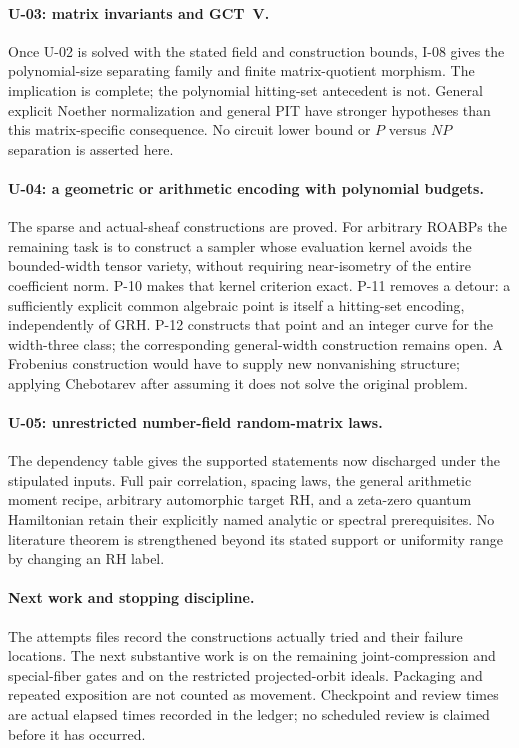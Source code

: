 \paragraph{U-03: matrix invariants and GCT~V.}
Once U-02 is solved with the stated field and construction bounds, I-08 gives the polynomial-size separating family and finite matrix-quotient morphism. The implication is complete; the polynomial hitting-set antecedent is not. General explicit Noether normalization and general PIT have stronger hypotheses than this matrix-specific consequence. No circuit lower bound or $P$ versus $NP$ separation is asserted here.

\paragraph{U-04: a geometric or arithmetic encoding with polynomial budgets.}
The sparse and actual-sheaf constructions are proved. For arbitrary ROABPs the remaining task is to construct a sampler whose evaluation kernel avoids the bounded-width tensor variety, without requiring near-isometry of the entire coefficient norm. P-10 makes that kernel criterion exact. P-11 removes a detour: a sufficiently explicit common algebraic point is itself a hitting-set encoding, independently of GRH. P-12 constructs that point and an integer curve for the width-three class; the corresponding general-width construction remains open. A Frobenius construction would have to supply new nonvanishing structure; applying Chebotarev after assuming it does not solve the original problem.

\paragraph{U-05: unrestricted number-field random-matrix laws.}
The dependency table gives the supported statements now discharged under the stipulated inputs. Full pair correlation, spacing laws, the general arithmetic moment recipe, arbitrary automorphic target RH, and a zeta-zero quantum Hamiltonian retain their explicitly named analytic or spectral prerequisites. No literature theorem is strengthened beyond its stated support or uniformity range by changing an RH label.

\paragraph{Next work and stopping discipline.}
The attempts files record the constructions actually tried and their failure locations. The next substantive work is on the remaining joint-compression and special-fiber gates and on the restricted projected-orbit ideals. Packaging and repeated exposition are not counted as movement. Checkpoint and review times are actual elapsed times recorded in the ledger; no scheduled review is claimed before it has occurred.
